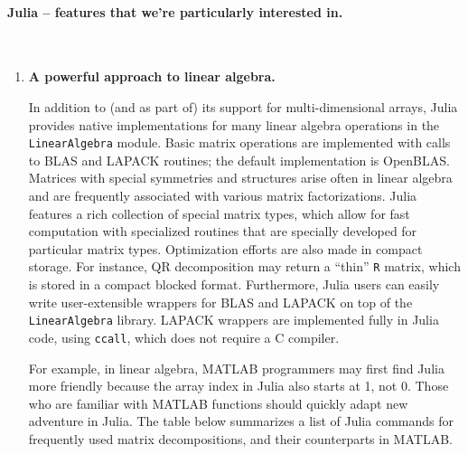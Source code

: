 \paragraph{Julia -- features that we're particularly interested in.} ~ 
\begin{enumerate} 
\item {\bf A powerful approach to linear algebra.}

In addition to (and as part of) its support for multi-dimensional arrays, Julia provides native implementations for many linear algebra operations in the \texttt{LinearAlgebra} module. Basic matrix operations are implemented with calls to BLAS and LAPACK routines; the default implementation is OpenBLAS. 
Matrices with special symmetries and structures arise often in linear algebra and are frequently associated with various matrix factorizations. Julia features a rich collection of special matrix types, which allow for fast computation with specialized routines that are specially developed for particular matrix types. Optimization efforts are also made in compact storage. For instance, QR decomposition may return a ``thin'' \texttt{R} matrix, which is stored in a compact blocked format. Furthermore, Julia users can easily write user-extensible wrappers for BLAS and LAPACK on top of the \texttt{LinearAlgebra} library. LAPACK wrappers are implemented fully in Julia code, using \texttt{ccall}, which does not require a C compiler. 

For example, in linear algebra, MATLAB programmers may first find Julia more friendly because the array index in Julia also starts at 1, not 0. Those who are familiar with MATLAB functions should quickly adapt new adventure in Julia. The table below summarizes a list of Julia commands for frequently used matrix decompositions, and their counterparts in MATLAB. 

\begin{table}[H]
\centering
{}
\caption{Interfaces of commonly used matrix decompositions 
in Julia and MATLAB} \label{freq-decomp}
\end{table}


\end{enumerate}
